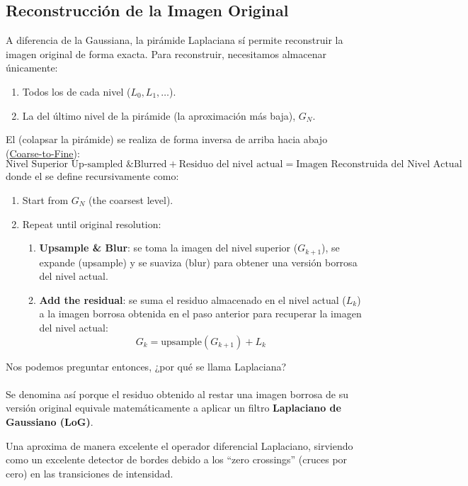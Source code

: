 \subsection{Reconstrucción de la Imagen Original}
\noindent
A diferencia de la Gaussiana, la pirámide Laplaciana sí permite reconstruir la imagen original de forma exacta. Para reconstruir, necesitamos almacenar únicamente:
\begin{enumerate}
    \item Todos los  de cada nivel ($L_0, L_1, \dots$).
    \item La  del último nivel de la pirámide (la aproximación más baja), $G_N$.
\end{enumerate}
\noindent
El  (colapsar la pirámide) se realiza de forma inversa de arriba hacia abajo (\underline{Coarse-to-Fine}):
$$\text{Nivel Superior Up-sampled \& Blurred} + \text{Residuo del nivel actual} = \text{Imagen Reconstruida del Nivel Actual}$$
donde el  se define recursivamente como:
\begin{enumerate}
    \item Start from $G_N$ (the coarsest level).
    \item Repeat until original resolution:
    \begin{enumerate}
        \item \textbf{Upsample \& Blur}: se toma la imagen del nivel superior ($G_{k+1}$), se expande (upsample) y se suaviza (blur) para obtener una versión borrosa del nivel actual.
        \item \textbf{Add the residual}: se suma el residuo almacenado en el nivel actual ($L_k$) a la imagen borrosa obtenida en el paso anterior para recuperar la imagen del nivel actual:
        $$G_k = \text{upsample}(G_{k+1}) + L_k$$
    \end{enumerate}
\end{enumerate}

\noindent
Nos podemos preguntar entonces, ¿por qué se llama Laplaciana? \\ \\
\noindent
Se denomina así porque el residuo obtenido al restar una imagen borrosa de su versión original equivale matemáticamente a aplicar un filtro \textbf{Laplaciano de Gaussiano (LoG)}.

\noindent
Una  aproxima de manera excelente el operador diferencial Laplaciano, sirviendo como un excelente detector de bordes debido a los ``zero crossings'' (cruces por cero) en las transiciones de intensidad.

